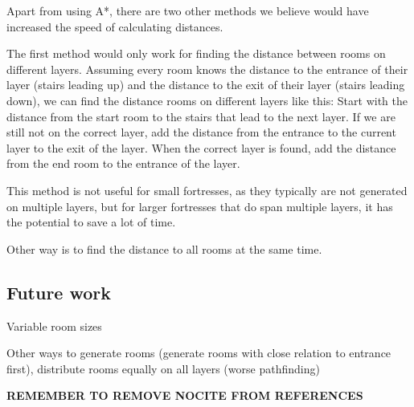 Apart from using A*, there are two other methods we believe would have increased the speed of calculating distances.

The first method would only work for finding the distance between rooms on different layers. Assuming every room knows the distance to the entrance of their layer (stairs leading up) and the distance to the exit of their layer (stairs leading down), we can find the distance rooms on different layers like this: Start with the distance from the start room to the stairs that lead to the next layer. If we are still not on the correct layer, add the distance from the entrance to the current layer to the exit of the layer. When the correct layer is found, add the distance from the end room to the entrance of the layer.

This method is not useful for small fortresses, as they typically are not generated on multiple layers, but for larger fortresses that do span multiple layers, it has the potential to save a lot of time.

Other way is to find the distance to all rooms at the same time.



\subsection{Future work}

Variable room sizes

Other ways to generate rooms (generate rooms with close relation to entrance first), distribute rooms equally on all layers (worse pathfinding)

\textbf{REMEMBER TO REMOVE NOCITE FROM REFERENCES}